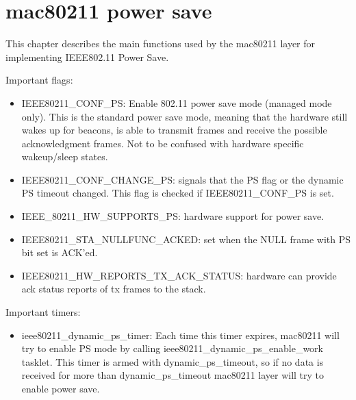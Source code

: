 \section{mac80211 power save}
\label{sec:mac80211}
This chapter describes the main functions used by the mac80211 layer for implementing IEEE802.11 Power Save.

Important flags:
\begin{itemize}
\item IEEE80211_CONF_PS: Enable 802.11 power save mode (managed mode only). This is the standard power save mode, meaning that the hardware still wakes up for beacons, is able to transmit frames and receive the possible acknowledgment frames. Not to be confused with hardware specific wakeup/sleep states.
\item IEEE80211_CONF_CHANGE_PS: signals that the PS flag or the dynamic PS timeout changed. This flag is checked if IEEE80211_CONF_PS is set.
\item IEEE_80211_HW_SUPPORTS_PS: hardware support for power save.
\item IEEE80211_STA_NULLFUNC_ACKED: set when the NULL frame with PS bit set is ACK'ed.
\item IEEE80211_HW_REPORTS_TX_ACK_STATUS: hardware can provide ack status reports of tx frames to the stack.
\end{itemize}

Important timers:
\begin{itemize}
\item ieee80211_dynamic_ps_timer: Each time this timer expires, mac80211 will try to enable PS mode by calling ieee80211_dynamic_ps_enable_work tasklet. This timer is armed with dynamic_ps_timeout, so if no data is received for more than dynamic_ps_timeout mac80211 layer will try to enable power save.
\end{itemize}

